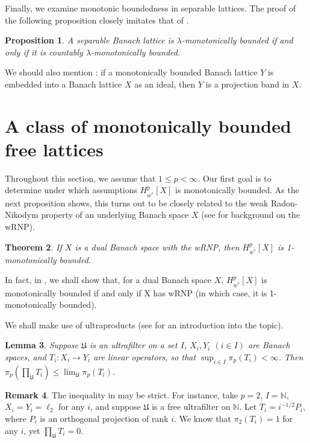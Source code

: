 \documentclass{amsart}
\theoremstyle{plain}
\newtheorem{theorem}{Theorem}[section]
\newtheorem{proposition}[theorem]{Proposition}
\newtheorem{lemma}[theorem]{Lemma}
\theoremstyle{definition}
\newtheorem{remark}[theorem]{Remark}
\numberwithin{equation}{section}
\newcommand{\N}{\mathbb{N}}
\newcommand{\Hp}{H_{w^*}^{p}}
\begin{document}
Finally, we examine monotonic boundedness in separable lattices. The proof of the following proposition closely imitates that of \cite[Lemma 2.5]{ABT}.

\begin{proposition}\label{sep mon bound}
 A separable Banach lattice is $\lambda$-monotonically bounded if and only if it is countably $\lambda$-monotonically bounded.
\end{proposition}

We should also mention \cite[Proposition 12.3]{dPWi}: if a monotonically bounded Banach lattice $Y$ is embedded into a Banach lattice $X$ as an ideal, then $Y$ is a projection band in $X$.


\section{A class of monotonically bounded free lattices}\label{+nakano}

Throughout this section, we assume that $1 \leq p < \infty$. Our first goal is to determine under which assumptions $\Hp[X]$ is monotonically bounded. As the next proposition shows, this turns out to be closely related to the weak Radon-Nikodym property of an underlying Banach space $X$ (see \cite[Section 7.4]{Bour} for background on the wRNP).
\begin{theorem}\label{wRNP_Hp}
 If $X$ is a dual Banach space with the wRNP, then $\Hp[X]$ is 1-monotonically bounded.
\end{theorem}
In fact, in , we shall show that, for a dual Banach space $X$, $\Hp[X]$ is monotonically bounded if and only if X has wRNP (in which case, it is 1-monotonically bounded).

We shall make use of ultraproducts (see \cite{Hein} for an introduction into the topic).

\begin{lemma}\label{ultraproduct}
Suppose $\mathfrak U$ is an ultrafilter on a set $I$, $X_i, Y_i$ $(i \in I)$ are Banach spaces, and $T_i : X_i \to Y_i$ are linear operators, so that $\sup_{i \in I} \pi_p(T_i) < \infty$. Then $\pi_p(\prod_{\mathfrak U} T_i) \leq \lim_{\mathfrak U} \pi_p(T_i)$.
\end{lemma}

\begin{remark}
 The inequality in  may be strict. For instance, take $p=2$, $I = \N$, $X_i = Y_i = \ell_2$ for any $i$, and suppose $\mathfrak U$ is a free ultrafilter on $\N$. Let $T_i = i^{-1/2} P_i$, where $P_i$ is an orthogonal projection of rank $i$. We know that $\pi_2(T_i) = 1$ for any $i$, yet $\prod_{\mathfrak U} T_i = 0$.
\end{remark}
\end{document}
